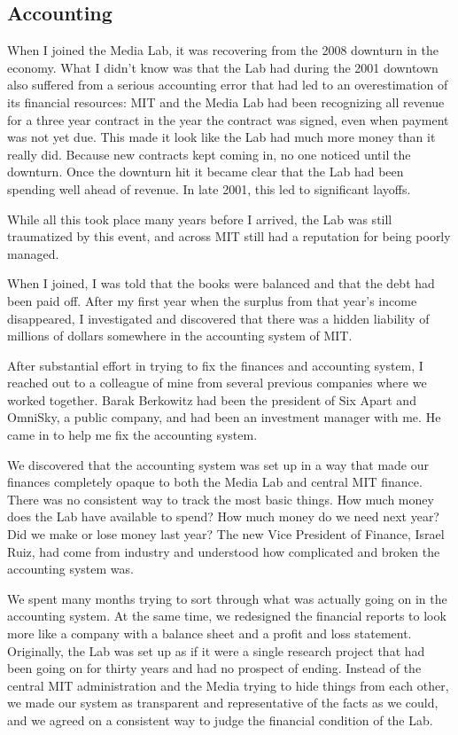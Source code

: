 \subsection{Accounting}

When I joined the Media Lab, it was recovering from the 2008 downturn in the economy. What I didn't know was that the Lab had during the 2001 downtown also suffered from a serious accounting error that had led to an overestimation of its financial resources: MIT and the Media Lab had been recognizing all revenue for a three year contract in the year the contract was signed, even when payment was not yet due. This made it look like the Lab had much more money than it really did. Because new contracts kept coming in, no one noticed until the downturn. Once the downturn hit it became clear that the Lab had been spending well ahead of revenue. In late 2001, this led to significant layoffs. 

While all this took place many years before I arrived, the Lab was still traumatized by this event, and across MIT still had a reputation for being poorly managed.

When I joined, I was told that the books were balanced and that the debt had been paid off. After my first year when the surplus from that year's income disappeared, I investigated and discovered that there was a hidden liability of millions of dollars somewhere in the accounting system of MIT.

After substantial effort in trying to fix the finances and accounting system, I reached out to a colleague of mine from several previous companies where we worked together. Barak Berkowitz had been the president of Six Apart and OmniSky, a public company, and had been an investment manager with me. He came in to help me fix the accounting system.

We discovered that the accounting system was set up in a way that made our finances completely opaque to both the Media Lab and central MIT finance. There was no consistent way to track the most basic things. How much money does the Lab have available to spend? How much money do we need next year? Did we make or lose money last year? The new Vice President of Finance, Israel Ruiz, had come from industry and understood how complicated and broken the accounting system was.

We spent many months trying to sort through what was actually going on in the accounting system. At the same time, we redesigned the financial reports to look more like a company with a balance sheet and a profit and loss statement. Originally, the Lab was set up as if it were a single research project that had been going on for thirty years and had no prospect of ending. Instead of the central MIT administration and the Media trying to hide things from each other, we made our system as transparent and representative of the facts as we could, and we agreed on a consistent way to judge the financial condition of the Lab.

